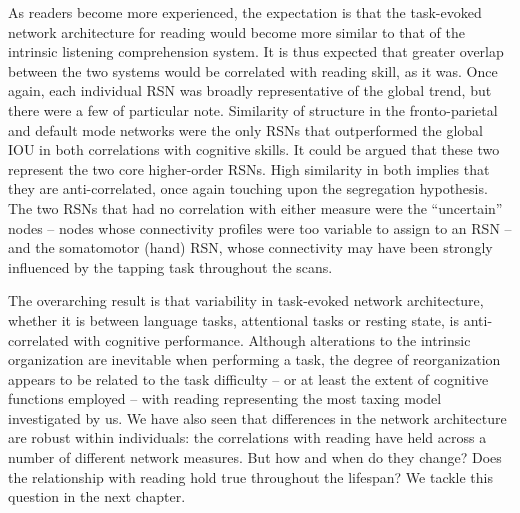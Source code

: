 As readers become more experienced, the expectation is that the task-evoked network architecture for reading would become more similar to that of the intrinsic listening comprehension system. It is thus expected that greater overlap between the two systems would be correlated with reading skill, as it was. Once again, each individual RSN was broadly representative of the global trend, but there were a few of particular note. Similarity of structure in the fronto-parietal and default mode networks were the only RSNs that outperformed the global IOU in both correlations with cognitive skills. It could be argued that these two represent the two core higher-order RSNs. High similarity in both implies that they are anti-correlated, once again touching upon the segregation hypothesis. The two RSNs that had no correlation with either measure were the ``uncertain'' nodes -- nodes whose connectivity profiles were too variable to assign to an RSN -- and the somatomotor (hand) RSN, whose connectivity may have been strongly influenced by the tapping task throughout the scans. 

%
The overarching result is that variability in task-evoked network architecture, whether it is between language tasks, attentional tasks or resting state, is anti-correlated with cognitive performance. Although alterations to the intrinsic organization are inevitable when performing a task, the degree of reorganization appears to be related to the task difficulty -- or at least the extent of cognitive functions employed -- with reading representing the most taxing model investigated by us. We have also seen that differences in the network architecture are robust within individuals: the correlations with reading have held across a number of different network measures. But how and when do they change? Does the relationship with reading hold true throughout the lifespan? We tackle this question in the next chapter. 